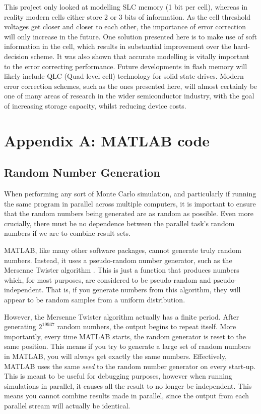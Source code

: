 \documentclass[11pt]{article}
\numberwithin{equation}{subsection}
\begin{document}
This project only looked at modelling SLC memory (1 bit per cell), whereas in reality modern cells either store 2 or 3 bits of information. As the cell threshold voltages get closer and closer to each other, the importance of error correction will only increase in the future. One solution presented here is to make use of soft information in the cell, which results in substantial improvement over the hard-decision scheme. It was also shown that accurate modelling is vitally important to the error correcting performance. Future developments in flash memory will likely include QLC (Quad-level cell) \cite{eetimes} technology for solid-state drives. Modern error correction schemes, such as the ones presented here, will almost certainly be one of many areas of research in the wider semiconductor industry, with the goal of increasing storage capacity, whilst reducing device costs. 

{}
\section*{Appendix A: MATLAB code}
\subsection*{Random Number Generation}
When performing any sort of Monte Carlo simulation, and particularly if running the same program in parallel across multiple computers, it is important to ensure that the random numbers being generated are as random as possible. Even more crucially, there must be no dependence between the parallel task's random numbers if we are to combine result sets.

MATLAB, like many other software packages, cannot generate truly random numbers. Instead, it uses a pseudo-random number generator, such as the Mersenne Twister algorithm \cite{matlab-rng}. This is just a function that produces numbers which, for most purposes, are considered to be pseudo-random and pseudo-independent. That is, if you generate numbers from this algorithm, they will appear to be random samples from a uniform distribution. 

However, the Mersenne Twister algorithm actually has a finite period. After generating $2^{19937}$ random numbers, the output begins to repeat itself. More importantly, every time MATLAB starts, the random generator is reset to the same position. This means if you try to generate a large set of random numbers in MATLAB, you will always get exactly the same numbers. Effectively, MATLAB uses the same \textit{seed} to the random number generator on every start-up. This is meant to be useful for debugging purposes, however when running simulations in parallel, it causes all the result to no longer be independent. This means you cannot combine results made in parallel, since the output from each parallel stream will actually be identical.
\end{document}
